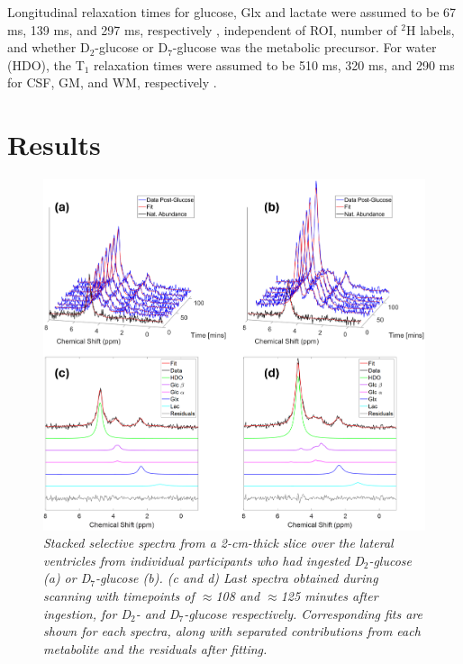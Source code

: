 Longitudinal relaxation times for glucose, Glx and lactate were assumed to be 67 ms, 139 ms, and 297 ms, respectively \cite{DeFeyter2018DeuteriumVivo}, independent of \ac{ROI}, number of $^2$H labels, and whether D$_2$-glucose or D$_7$-glucose was the metabolic precursor. For water (\ac{HDO}), the T$_1$ relaxation times were assumed to be 510 ms, 320 ms, and 290 ms for \ac{CSF}, \ac{GM}, and \ac{WM}, respectively \cite{Cocking2023DeuteriumDosing}.

\section{Results}

\begin{figure}
    \centering
    \includegraphics[width = 1\textwidth]{Figures/Glucose/Selective.png}
    \caption{\textit{Stacked selective spectra from a 2-cm-thick slice over the lateral ventricles from individual participants who had ingested D$_2$-glucose (a) or D$_7$-glucose (b). (c and d) Last spectra obtained during scanning with timepoints of $\approx$108 and $\approx$125 minutes after ingestion, for D$_2$- and D$_7$-glucose respectively. Corresponding fits are shown for each spectra, along with separated contributions from each metabolite and the residuals after fitting.}}
    \label{fig:Glu:Select}
\end{figure}

